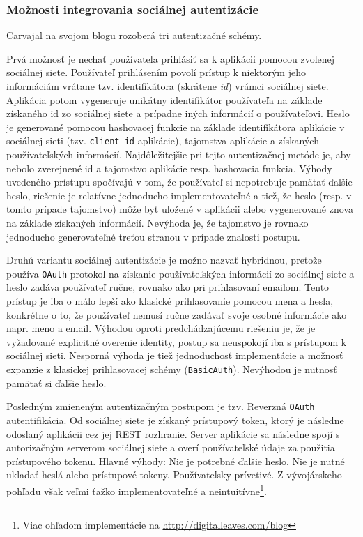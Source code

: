 \documentclass[12pt,oneside]{fithesis2}
\begin{document}
			\subsubsection{Možnosti integrovania sociálnej autentizácie}
Carvajal na svojom blogu rozoberá tri autentizačné schémy. 
      		\par Prvá možnosť je nechať používateľa prihlásiť sa k aplikácii pomocou zvolenej sociálnej siete. Používateľ prihlásením povolí prístup k niektorým jeho informáciám vrátane tzv. identifikátora (skrátene \textit{id}) vrámci sociálnej siete. Aplikácia potom vygeneruje unikátny identifikátor používateľa na základe získaného id zo sociálnej siete a prípadne iných informácií o používateľovi. Heslo je generované pomocou hashovacej funkcie na základe identifikátora aplikácie v sociálnej sieti (tzv. \texttt{client id} aplikácie), tajomstva aplikácie a získaných používateľských informácií. Najdôležitejšie pri tejto autentizačnej metóde je, aby nebolo zverejnené id a tajomstvo aplikácie resp. hashovacia funkcia. Výhody uvedeného prístupu spočívajú v tom, že používateľ si nepotrebuje pamätať ďalšie heslo, riešenie je relatívne jednoducho implementovateľné a tiež, že heslo (resp. v tomto prípade tajomstvo) môže byť uložené v aplikácii alebo vygenerované znova na základe získaných informácií. Nevýhoda je, že tajomstvo je rovnako jednoducho generovateľné treťou stranou v prípade znalosti postupu.
      		\par Druhú variantu sociálnej autentizácie je možno nazvať hybridnou, pretože používa \texttt{OAuth} protokol na získanie používateľských informácií zo sociálnej siete a heslo zadáva používateľ ručne, rovnako ako pri prihlasovaní emailom. Tento prístup je iba o málo lepší ako klasické prihlasovanie pomocou mena a hesla, konkrétne o to, že používateľ nemusí ručne zadávať svoje osobné informácie ako napr. meno a email. Výhodou oproti predchádzajúcemu riešeniu je, že je vyžadované explicitné overenie identity, postup sa neuspokojí iba s prístupom k sociálnej sieti. Nesporná výhoda je tiež jednoduchosť implementácie a možnosť expanzie z klasickej prihlasovacej schémy (\texttt{BasicAuth}). Nevýhodou je nutnosť pamätať si ďalšie heslo.
      		\par Posledným zmieneným autentizačným postupom je tzv. Reverzná \texttt{OAuth} autentifikácia. Od sociálnej siete je získaný prístupový token, ktorý je následne odoslaný aplikácii cez jej REST rozhranie. Server aplikácie sa následne spojí s autorizačným serverom sociálnej siete a overí používateľské údaje za použitia prístupového tokenu. Hlavné výhody: Nie je potrebné ďalšie heslo. Nie je nutné ukladať heslá alebo prístupové tokeny. Používateľsky prívetivé. Z vývojárskeho pohľadu však veľmi ťažko implementovateľné a neintuitívne\footnote{Viac ohľadom implementácie na \url{http://digitalleaves.com/blog}}.
      		      		
\end{document}
